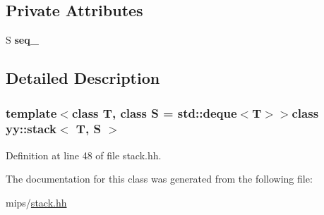 \subsection*{Private Attributes}
\begin{DoxyCompactItemize}
\item 
\hypertarget{classyy_1_1stack_ae0a9cbe8fb11651438de273ee7a6ef2e}{S {\bfseries seq\-\_\-}}\label{classyy_1_1stack_ae0a9cbe8fb11651438de273ee7a6ef2e}

\end{DoxyCompactItemize}


\subsection{Detailed Description}
\subsubsection*{template$<$class T, class S = std\-::deque$<$\-T$>$$>$class yy\-::stack$<$ T, S $>$}



Definition at line 48 of file stack.\-hh.



The documentation for this class was generated from the following file\-:\begin{DoxyCompactItemize}
\item 
mips/\hyperlink{stack_8hh}{stack.\-hh}\end{DoxyCompactItemize}
